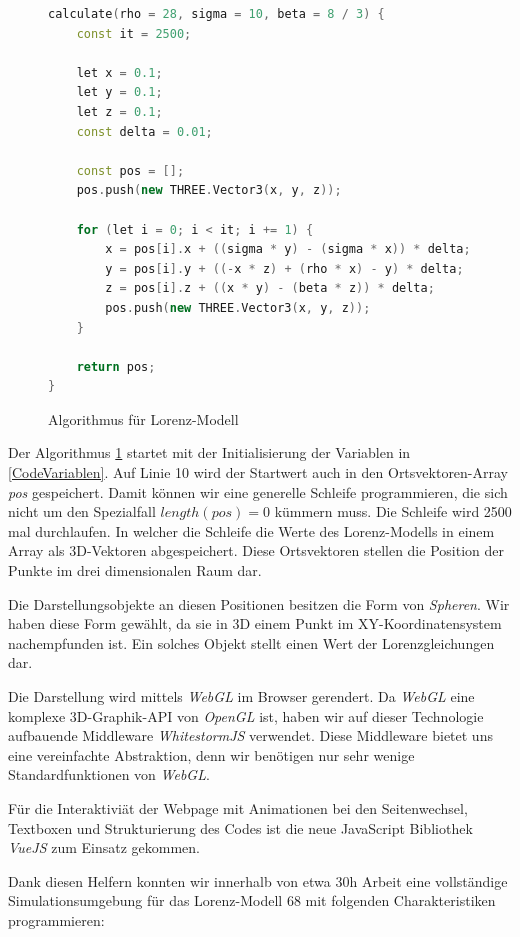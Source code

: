\begin{figure}
	\begin{lstlisting}[style=C, language=C++]
calculate(rho = 28, sigma = 10, beta = 8 / 3) {
	const it = 2500;
	
	let x = 0.1;
	let y = 0.1;
	let z = 0.1;
	const delta = 0.01;
	
	const pos = [];
	pos.push(new THREE.Vector3(x, y, z));
	
	for (let i = 0; i < it; i += 1) {
		x = pos[i].x + ((sigma * y) - (sigma * x)) * delta;
		y = pos[i].y + ((-x * z) + (rho * x) - y) * delta;
		z = pos[i].z + ((x * y) - (beta * z)) * delta;
		pos.push(new THREE.Vector3(x, y, z));
	}
	
	return pos;
}
		\end{lstlisting}
		\caption{Algorithmus für Lorenz-Modell\label{AlgorithmusLorenz}}
\end{figure}


Der Algorithmus \ref{AlgorithmusLorenz} startet mit der Initialisierung der Variablen in \ref{CodeVariablen}. Auf Linie 10 wird der Startwert auch in den Ortsvektoren-Array \textit{pos} gespeichert. Damit können wir eine generelle Schleife programmieren, die sich nicht um den Spezialfall $ length(pos) = 0 $ kümmern muss.
Die Schleife wird 2500 mal durchlaufen. In welcher die Schleife die Werte des Lorenz-Modells in einem Array als 3D-Vektoren abgespeichert. Diese Ortsvektoren stellen die Position der Punkte im drei dimensionalen Raum dar.

Die Darstellungsobjekte an diesen Positionen besitzen die Form von \textit{Spheren}. Wir haben diese Form gewählt, da sie in 3D einem Punkt im XY-Koordinatensystem nachempfunden ist. Ein solches Objekt stellt einen Wert der Lorenzgleichungen dar.

Die Darstellung wird mittels \textit{WebGL}\cite{WebGL} im Browser gerendert. Da \textit{WebGL} eine komplexe 3D-Graphik-API von \textit{OpenGL} ist, haben wir auf dieser Technologie aufbauende Middleware \textit{WhitestormJS}\cite{whitestormJS} verwendet. Diese Middleware bietet uns eine vereinfachte Abstraktion, denn wir benötigen nur sehr wenige Standardfunktionen von \textit{WebGL}.

Für die Interaktiviät der Webpage mit Animationen bei den Seitenwechsel, Textboxen und Strukturierung des Codes ist die neue JavaScript Bibliothek \textit{VueJS}\cite{VueJS} zum Einsatz gekommen.

Dank diesen Helfern konnten wir innerhalb von etwa 30h Arbeit eine vollständige Simulationsumgebung für das Lorenz-Modell 68 mit folgenden Charakteristiken programmieren:

